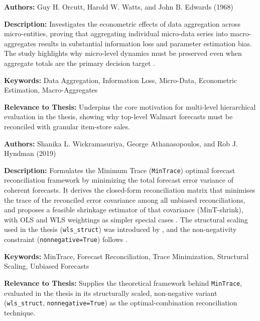 {

	\textbf{Authors:}
	Guy H. Orcutt, Harold W. Watts, and John B. Edwards (1968)

	\textbf{Description:}
	Investigates the econometric effects of data aggregation across micro-entities, proving that aggregating individual micro-data series into macro-aggregates results in substantial information loss and parameter estimation bias. The study highlights why micro-level dynamics must be preserved even when aggregate totals are the primary decision target \autocite{Orcutt:1968}.

	\textbf{Keywords:}
	Data Aggregation, Information Loss, Micro-Data, Econometric Estimation, Macro-Aggregates

	\textbf{Relevance to Thesis:}
	Underpins the core motivation for multi-level hierarchical evaluation in the thesis, showing why top-level Walmart forecasts must be reconciled with granular item-store sales.

}

{

	\textbf{Authors:}
	Shanika L. Wickramasuriya, George Athanasopoulos, and Rob J. Hyndman (2019)

	\textbf{Description:}
	Formulates the Minimum Trace (\texttt{MinTrace}) optimal forecast reconciliation framework by minimizing the total forecast error variance of coherent forecasts. It derives the closed-form reconciliation matrix that minimises the trace of the reconciled error covariance among all unbiased reconciliations, and proposes a feasible shrinkage estimator of that covariance (MinT-shrink), with OLS and WLS weightings as simpler special cases \autocite{Wickramasuriya:2019}. The structural scaling used in the thesis (\texttt{wls\_struct}) was introduced by \textcite{Athanasopoulos:2017}, and the non-negativity constraint (\texttt{nonnegative=True}) follows \textcite{Wickramasuriya:2020}.

	\textbf{Keywords:}
	MinTrace, Forecast Reconciliation, Trace Minimization, Structural Scaling, Unbiased Forecasts

	\textbf{Relevance to Thesis:}
	Supplies the theoretical framework behind \texttt{MinTrace}, evaluated in the thesis in its structurally scaled, non-negative variant (\texttt{wls\_struct}, \texttt{nonnegative=True}) as the optimal-combination reconciliation technique.

}

